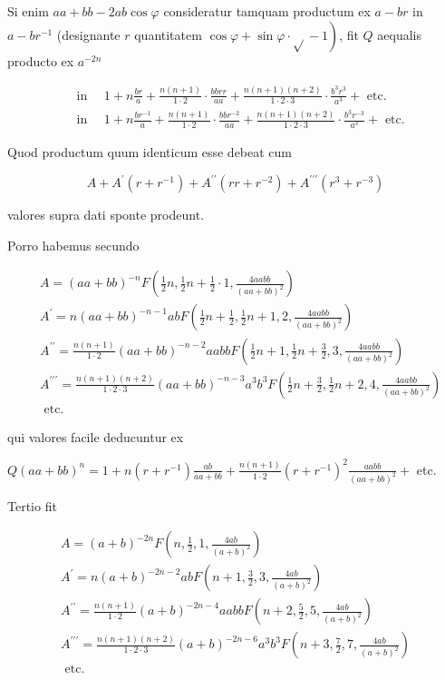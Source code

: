 \documentclass[10pt]{article}
\begin{document}
Si enim \(a a+b b-2 a b \cos \varphi\) consideratur tamquam productum ex \(a-b r\) in \(a-b r^{-1}\) (designante \(r\) quantitatem \(\left.\cos \varphi+\sin \varphi \cdot \sqrt{ }-1\right)\), fit \(Q\) aequalis producto ex \(a^{-2 n}\)

\[
\begin{aligned}
& \text { in } \quad 1+n \frac{b r}{a}+\frac{n(n+1)}{1 \cdot 2} \cdot \frac{b b r r}{a a}+\frac{n(n+1)(n+2)}{1 \cdot 2 \cdot 3} \cdot \frac{b^{3} r^{3}}{a^{3}}+\text { etc. } \\
& \text { in } \quad 1+n \frac{b r^{-1}}{a}+\frac{n(n+1)}{1 \cdot 2} \cdot \frac{b b r^{-2}}{a a}+\frac{n(n+1)(n+2)}{1 \cdot 2 \cdot 3} \cdot \frac{b^{3} r^{-3}}{a^{3}}+\text { etc. }
\end{aligned}
\]

Quod productum quum identicum esse debeat cum

\[
A+A^{\prime}\left(r+r^{-1}\right)+A^{\prime \prime}\left(r r+r^{-2}\right)+A^{\prime \prime \prime}\left(r^{3}+r^{-3}\right)
\]

valores supra dati sponte prodeunt.

Porro habemus secundo

\[
\begin{aligned}
& A=(a a+b b)^{-n} F\left(\frac{1}{2} n, \frac{1}{2} n+\frac{1}{2} \cdot 1, \frac{4 a a b b}{(a a+b b)^{2}}\right) \\
& A^{\prime}=n(a a+b b)^{-n-1} a b F\left(\frac{1}{2} n+\frac{1}{2}, \frac{1}{2} n+1,2, \frac{4 a a b b}{(a a+b b)^{2}}\right) \\
& A^{\prime \prime}=\frac{n(n+1)}{1 \cdot 2}(a a+b b)^{-n-2} a a b b F\left(\frac{1}{2} n+1, \frac{1}{2} n+\frac{3}{2}, 3, \frac{4 a a b b}{(a a+b b)^{2}}\right) \\
& A^{\prime \prime \prime}=\frac{n(n+1)(n+2)}{1 \cdot 2 \cdot 3}(a a+b b)^{-n-3} a^{3} b^{3} F\left(\frac{1}{2} n+\frac{3}{2}, \frac{1}{2} n+2,4, \frac{4 a a b b}{(a a+b b)^{2}}\right) \\
& \text { etc. }
\end{aligned}
\]

qui valores facile deducuntur ex

\(Q(a a+b b)^{n}=1+n\left(r+r^{-1}\right) \frac{a b}{a a+b b}+\frac{n(n+1)}{1 \cdot 2}\left(r+r^{-1}\right)^{2} \frac{a a b b}{(a a+b b)^{2}}+\) etc.

Tertio fit

\[
\begin{gathered}
A=(a+b)^{-2 n} F\left(n, \frac{1}{2}, 1, \frac{4 a b}{(a+b)^{2}}\right) \\
A^{\prime}=n(a+b)^{-2 n-2} a b F\left(n+1, \frac{3}{2}, 3, \frac{4 a b}{(a+b)^{2}}\right) \\
A^{\prime \prime}=\frac{n(n+1)}{1 \cdot 2}(a+b)^{-2 n-4} a a b b F\left(n+2, \frac{5}{2}, 5, \frac{4 a b}{(a+b)^{2}}\right) \\
A^{\prime \prime \prime}=\frac{n(n+1)(n+2)}{1 \cdot 2 \cdot 3}(a+b)^{-2 n-6} a^{3} b^{3} F\left(n+3, \frac{7}{2}, 7, \frac{4 a b}{(a+b)^{2}}\right) \\
\text { etc. }
\end{gathered}
\]
\end{document}
